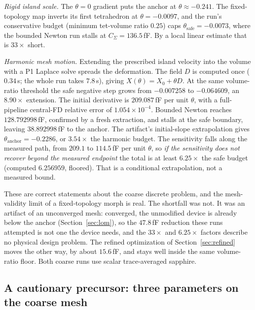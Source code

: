 \documentclass{anvil-paper}
\begin{document}
\emph{Rigid island scale.} The $\theta = 0$ gradient puts the anchor at
$\theta \approx -0.241$. The fixed-topology map inverts its first
tetrahedron at $\theta = -0.0097$, and the run's conservative budget
(minimum tet-volume ratio $0.25$) caps
$\theta_{\mathrm{safe}} = -0.0073$, where the bounded Newton run stalls
at $C_\Sigma = 136.5$\,fF. By a local linear estimate that is
$33\times$ short.

\emph{Harmonic mesh motion.} Extending the prescribed island velocity
into the volume with a P1 Laplace solve spreads the deformation. The
field $D$ is computed once ($0.34$\,s; the whole run takes $7.8$\,s),
giving $X(\theta)=X_0+\theta D$. At the same volume-ratio threshold the
safe negative step grows from $-0.007258$ to $-0.064609$, an
$8.90\times$ extension. The initial derivative is $209.087$\,fF per
unit $\theta$, with a full-pipeline central-FD relative error of
$1.054\times10^{-4}$. Bounded Newton reaches $128.792998$\,fF,
confirmed by a fresh extraction, and stalls at the safe boundary,
leaving $38.892998$\,fF to the anchor. The artifact's initial-slope
extrapolation gives $\theta_{\mathrm{anchor}}=-0.2286$, or $3.54\times$
the harmonic budget. The sensitivity falls along the measured path,
from $209.1$ to $114.5$\,fF per unit $\theta$, so \emph{if the
sensitivity does not recover beyond the measured endpoint} the total
is at least $6.25\times$ the safe budget (computed $6.256959$,
floored). That is a conditional extrapolation, not a measured bound.

These are correct statements about the coarse discrete problem, and the
mesh-validity limit of a fixed-topology morph is real. The shortfall
was not. It was an artifact of an unconverged mesh: converged, the
unmodified device is already below the anchor (Section~\ref{sec:lom}),
so the $47.8$\,fF reduction these runs attempted is not one the device
needs, and the $33\times$ and $6.25\times$ factors describe no physical
design problem. The refined optimization of Section~\ref{sec:refined}
moves the other way, by about $15.6$\,fF, and stays well inside the
same volume-ratio floor. Both coarse runs use scalar trace-averaged
sapphire.

\subsection{A cautionary precursor: three parameters on the coarse mesh}
\label{sec:multiparam}
\end{document}
